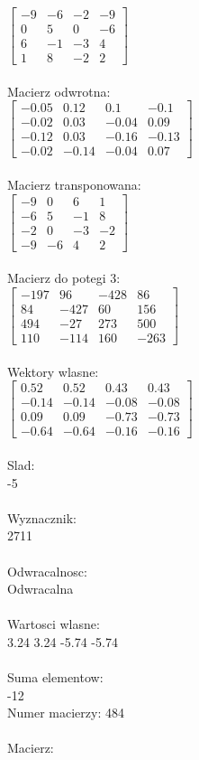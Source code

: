 \documentclass[a4paper,12pt]{article}
\begin{document}
$\begin{bmatrix} -9&-6&-2&-9\\0&5&0&-6\\6&-1&-3&4\\1&8&-2&2 \end{bmatrix}$
\\
\\
Macierz odwrotna:\\

$\begin{bmatrix} -0.05&0.12&0.1&-0.1\\-0.02&0.03&-0.04&0.09\\-0.12&0.03&-0.16&-0.13\\-0.02&-0.14&-0.04&0.07 \end{bmatrix}$
\\
\\
Macierz transponowana:\\

$\begin{bmatrix} -9&0&6&1\\-6&5&-1&8\\-2&0&-3&-2\\-9&-6&4&2 \end{bmatrix}$
\\
\\
Macierz do potegi 3:\\

$\begin{bmatrix} -197&96&-428&86\\84&-427&60&156\\494&-27&273&500\\110&-114&160&-263 \end{bmatrix}$
\\
\\
Wektory wlasne:\\

$\begin{bmatrix} 0.52&0.52&0.43&0.43\\-0.14&-0.14&-0.08&-0.08\\0.09&0.09&-0.73&-0.73\\-0.64&-0.64&-0.16&-0.16 \end{bmatrix}$
\\
\\
Slad:\\
-5
\\
\\
Wyznacznik:\\
2711
\\
\\
Odwracalnosc:\\
Odwracalna
\\
\\
Wartosci wlasne:\\
3.24 3.24 -5.74 -5.74
\\
\\
Suma elementow:\\
-12
\\
\newpage
Numer macierzy:
484
\\
\\
Macierz:\\
\end{document}
